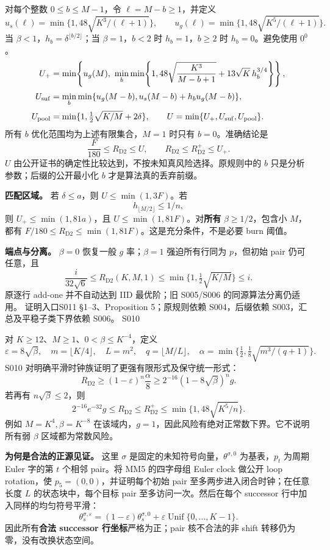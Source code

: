 \documentclass[11pt,a4paper]{article}
\newcommand{\R}{R_{\mathrm{D2}}}\newcommand{\Rp}{R_{\mathrm{D2}}^{+}}
\newcommand{\dd}{\delta}
\newcommand{\head}[2]{{\small\sffamily #1}\par\vspace{2pt}{\LARGE\bfseries #2}\par\vspace{5pt}}
\newcommand{\entry}[1]{\vfill\noindent\small 证明入口\quad #1\normalsize}
\begin{document}
对每个整数 $0\le b\le M-1$，令 $\ell=M-b\ge1$，并定义
\[
 u_s(\ell)=\min\{1,48\sqrt{K^3/(\ell+1)}\},\qquad
 u_g(\ell)=\min\{1,48\sqrt{K^5/(\ell+1)}\}.
\]
当 $\beta<1$，$h_b=\dd^{\lfloor b/2\rfloor}$；当 $\beta=1$，$b<2$ 时 $h_b=1$，$b\ge2$ 时 $h_b=0$。避免使用 $0^0$。
\begin{align*}
 U_+&=\min\!\left\{u_g(M),\ \min_b\min\!\left\{1,
 48\sqrt{\frac{K^3}{M-b+1}}+13\sqrt K\,h_b^{3/4}\right\}\right\},\\[2pt]
 U_{\rm suf}&=\min_b\min\{u_g(M-b),u_s(M-b)+h_bu_g(M-b)\},\\[2pt]
 U_{\rm pool}&=\min\{1,\tfrac12\sqrt{K/M}+2\dd\},\qquad
 U=\min\{U_+,U_{\rm suf},U_{\rm pool}\}.
\end{align*}
所有 $b$ 优化范围均为上述有限集合，$M=1$ 时只有 $b=0$。准确结论是
\[
 \frac{F}{180}\le\R\le U,\qquad \R\le\Rp\le U_+.
\]
$U$ 由公开证书的确定性比较达到，不按未知真风险选择。原规则中的 $b$ 只是分析参数；后缀的公开最小化 $b$ 才是算法真的丢弃前缀。

\textbf{匹配区域。} 若 $\dd\le a$，则 $U\le\min(1,3F)$。若
\[
 h_{\lfloor M/2\rfloor}\le1/n,
\]
则 $U_+\le\min(1,81a)$，且 $U\le\min(1,81F)$。对\textbf{所有} $\beta\ge1/2$，包含小 $M$，都有 $F/180\le\R\le\min(1,81F)$。这是充分条件，不是必要 burn 阈值。

\textbf{端点与分离。} $\beta=0$ 恢复一般 $g$ 率；$\beta=1$ 强迫所有行同为 $p$，但初始 pair 仍可任意，且
\[
 \frac{i}{32\sqrt6}\le\R(K,M,1)
 \le\min\{1,\tfrac12\sqrt{K/M}\}\le i.
\]
原逐行 add-one 并不自动达到 IID 最优阶；旧 S005/S006 的同源算法分离仍适用。
\entry{S011 §1--3、Proposition 5；原规则依赖 S004，后缀依赖 S003，汇总及平稳子类下界依赖 S006。}
\newpage
\head{S010}{正源平滑时钟保留独立价值}
对 $K\ge12$、$M\ge1$、$0<\beta\le K^{-4}$，定义
\[
 \varepsilon=8\sqrt\beta,\quad m=\lfloor K/4\rfloor,\quad L=m^2,\quad
 q=\lfloor M/L\rfloor,\quad
 \alpha=\min\{\tfrac12,\tfrac18\sqrt{m^3/(q+1)}\}.
\]
S010 对明确平滑时钟族证明了更强有限形式及保守统一形式：
\[
 \R\ge(1-\varepsilon)^n\frac\alpha8
 \ge 2^{-16}(1-8\sqrt\beta)^n g.
\]
若再有 $n\sqrt\beta\le2$，则
\[
 2^{-16}e^{-32}g\le\R\le\Rp
 \le\min\{1,48\sqrt{K^5/n}\}.
\]
例如 $M=K^4,\beta=K^{-8}$ 在该域内，$g=1$，因此风险有绝对正常数下界。它不说明所有弱 $\beta$ 区域都为常数风险。

\textbf{为何是合法的正源见证。} 这里 $\sigma$ 是固定的未知符号向量，$\theta^{\sigma,0}$ 为基表，$p_t$ 为周期 Euler 字的第 $t$ 个相邻 pair。将 MM5 的四字母组 Euler clock 做公开 loop rotation，使 $p_5=(0,0)$，并证明每个初始 pair 至多两步进入闭合时钟；在任意长度 $L$ 的状态块中，每个目标 pair 至多访问一次。然后在每个 successor 行中加入同样的均匀符号平滑：
\[
 \theta^{\sigma,\varepsilon}_s=(1-\varepsilon)\theta^{\sigma,0}_s+
 \varepsilon\operatorname{Unif}\{0,\ldots,K-1\}.
\]
因此所有\textbf{合法 successor 行坐标}严格为正；pair 核不合法的非 shift 转移仍为零，没有改换状态空间。
\end{document}
